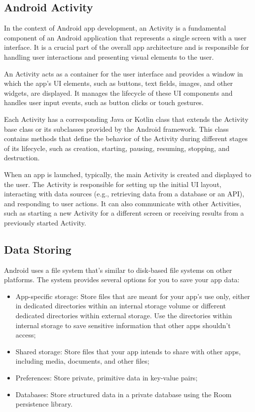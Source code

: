 \subsection{Android Activity}
In the context of Android app development, an Activity is a fundamental component of an Android application that represents a single screen with a user interface. It is a crucial part of the overall app architecture and is responsible for handling user interactions and presenting visual elements to the user.

An Activity acts as a container for the user interface and provides a window in which the app's UI elements, such as buttons, text fields, images, and other widgets, are displayed. It manages the lifecycle of these UI components and handles user input events, such as button clicks or touch gestures.

Each Activity has a corresponding Java or Kotlin class that extends the Activity base class or its subclasses provided by the Android framework. This class contains methods that define the behavior of the Activity during different stages of its lifecycle, such as creation, starting, pausing, resuming, stopping, and destruction.

When an app is launched, typically, the main Activity is created and displayed to the user. The Activity is responsible for setting up the initial UI layout, interacting with data sources (e.g., retrieving data from a database or an API), and responding to user actions. It can also communicate with other Activities, such as starting a new Activity for a different screen or receiving results from a previously started Activity.

\subsection{Data Storing}
Android uses a file system that's similar to disk-based file systems on other platforms. The system provides several options for you to save your app data:
\begin{itemize}
    \item App-specific storage: Store files that are meant for your app's use only, either in dedicated directories within an internal storage volume or different dedicated directories within external storage. Use the directories within internal storage to save sensitive information that other apps shouldn't access;
    \item Shared storage: Store files that your app intends to share with other apps, including media, documents, and other files;
    \item Preferences: Store private, primitive data in key-value pairs;
    \item Databases: Store structured data in a private database using the Room persistence library.    
\end{itemize}


